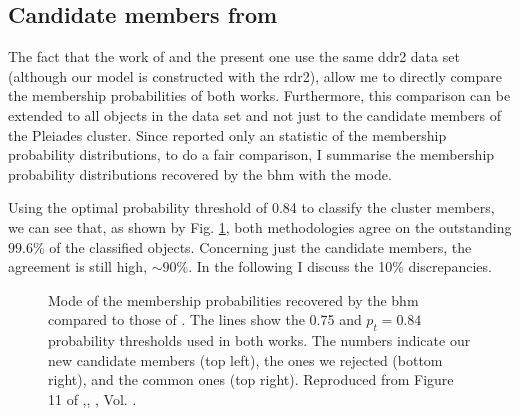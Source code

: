 \subsection{Candidate members from \citet{Bouy2015}}
\label{sect:comparisonBouy}

The fact that the work of \citet{Bouy2015} and the present one use the same \gls{ddr2} data set (although our model is constructed with the \gls{rdr2}), allow me to directly compare the membership probabilities of both works. Furthermore, this comparison can be extended to all objects in the data set and not just to the candidate members of the Pleiades cluster. Since \citet{Bouy2015} reported only an statistic of the membership probability distributions, to do a fair comparison, I summarise the membership probability distributions recovered by the \gls{bhm} with the mode.

Using the optimal probability threshold of 0.84 to classify the cluster members, we can see that, as shown by Fig. \ref{fig:BHMBouy}, both methodologies agree on the outstanding $99.6$\% of the classified objects. Concerning just the candidate members, the agreement is still high, $\sim 90\%$. In the following I discuss the 10\% discrepancies.

\begin{figure}[ht!]
\begin{center}
\caption{Mode of the membership probabilities recovered by the \gls{bhm} compared to those of \citet{Bouy2015}. The lines show the 0.75 and $p_t=0.84$ probability thresholds used in both works. The numbers indicate our new candidate members (top left), the ones we rejected (bottom right), and the common ones (top right). Reproduced from Figure 11 of \citet{Olivares2017},\textit{}, , Vol. .}
\label{fig:BHMBouy}
\end{center}
\end{figure}

